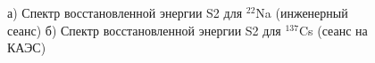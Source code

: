 \begin{figure}[H]
\begin{minipage}[ht]{0.49\linewidth}
  \end{minipage}
  \caption[Спектры восстановленной энергии S2 для калибровочных источников]{а) Спектр восстановленной энергии S2 для $^{22}$Na (инженерный сеанс) б) Спектр восстановленной энергии S2 для $^{137}$Cs (сеанс на КАЭС)}
  \label{img:NaCsfit}  
\end{figure}


